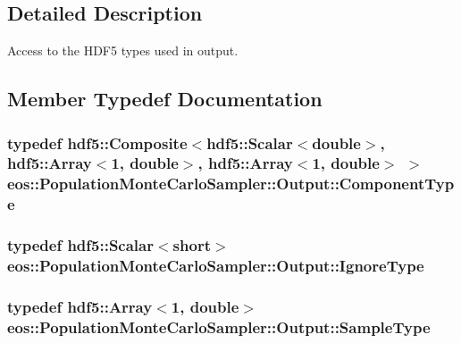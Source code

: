 \subsection{Detailed Description}
Access to the HDF5 types used in output. 

\subsection{Member Typedef Documentation}
\hypertarget{structeos_1_1PopulationMonteCarloSampler_1_1Output_a5fd76b324d88b7fbd14306e8a15e4db9}{
\subsubsection[{ComponentType}]{\setlength{\rightskip}{0pt plus 5cm}typedef {\bf hdf5::Composite}$<${\bf hdf5::Scalar}$<$double$>$, {\bf hdf5::Array}$<$1, double$>$, {\bf hdf5::Array}$<$1, double$>$ $>$ {\bf eos::PopulationMonteCarloSampler::Output::ComponentType}}}
\label{structeos_1_1PopulationMonteCarloSampler_1_1Output_a5fd76b324d88b7fbd14306e8a15e4db9}
\hypertarget{structeos_1_1PopulationMonteCarloSampler_1_1Output_aa7e9c8fa59ff4cc77d830c9c2661435e}{
\subsubsection[{IgnoreType}]{\setlength{\rightskip}{0pt plus 5cm}typedef {\bf hdf5::Scalar}$<$short$>$ {\bf eos::PopulationMonteCarloSampler::Output::IgnoreType}}}
\label{structeos_1_1PopulationMonteCarloSampler_1_1Output_aa7e9c8fa59ff4cc77d830c9c2661435e}
\hypertarget{structeos_1_1PopulationMonteCarloSampler_1_1Output_ab096268a8fccb7e8d34ed08b93df880c}{
\subsubsection[{SampleType}]{\setlength{\rightskip}{0pt plus 5cm}typedef {\bf hdf5::Array}$<$1, double$>$ {\bf eos::PopulationMonteCarloSampler::Output::SampleType}}}
